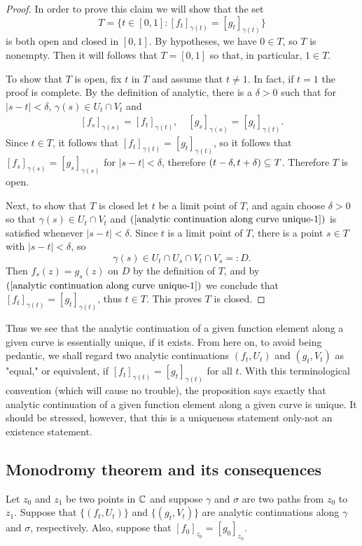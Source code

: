 \begin{proof}
In order to prove this claim we will show that the set
\[T=\{t\in[0,1]:[f_t]_{\gamma(t)}=[g_t]_{\gamma(t)}\}\]
is both open and closed in $[0,1]$. By hypotheses, we have $0\in T$, so $T$ is nonempty. Then it will follows that $T=[0,1]$ so that, in particular, $1\in T$.\par
To show that $T$ is open, fix $t$ in $T$ and assume that $t\neq 1$. In fact, if $t=1$ the proof is complete. By the definition of analytic, there is a $\delta>0$ such that for $|s-t|<\delta$, $\gamma(s)\in U_t\cap V_t$ and
\begin{align}\label{analytic continuation along curve unique-1}
[f_s]_{\gamma(s)}=[f_t]_{\gamma(t)},\quad [g_s]_{\gamma(s)}=[g_t]_{\gamma(t)}.
\end{align}
Since $t\in T$, it follows that $[f_t]_{\gamma(t)}=[g_t]_{\gamma(t)}$, so it follows that $[f_s]_{\gamma(s)}=[g_s]_{\gamma(s)}$ for $|s-t|<\delta$, therefore $(t-\delta,t+\delta)\subseteq T$. Therefore $T$ is open.\par
Next, to show that $T$ is closed let $t$ be a limit point of $T$, and again choose $\delta>0$ so that $\gamma(s)\in U_t\cap V_t$ and $(\ref{analytic continuation along curve unique-1})$ is satisfied whenever $|s-t|<\delta$. Since $t$ is a limit point of $T$, there is a point $s\in T$ with $|s-t|<\delta$, so
\[\gamma(s)\in U_t\cap U_s\cap V_t\cap V_s=:D.\]
Then $f_s(z)=g_s(z)$ on $D$ by the definition of $T$, and by $(\ref{analytic continuation along curve unique-1})$ we conclude that $[f_t]_{\gamma(t)}=[g_{t}]_{\gamma(t)}$, thus $t\in T$. This proves $T$ is closed.
\end{proof}
Thus we see that the analytic continuation of a given function element along a given curve is essentially unique, if it exists. From here on, to avoid being pedantic, we shall regard two analytic continuations $(f_t,U_t)$ and $(g_t,V_t)$ as "equal," or equivalent, if $[f_t]_{\gamma(t)}=[g_t]_{\gamma(t)}$ for all $t$. With this terminological convention (which will cause no trouble), the proposition says exactly that analytic continuation of a given function element along a given curve is unique. It should be stressed, however, that this is a uniqueness statement only-not an existence statement.
\subsection{Monodromy theorem and its consequences}
Let $z_0$ and $z_1$ be two points in $\mathbb{C}$ and suppose $\gamma$ and $\sigma$ are two paths from $z_0$ to $z_1$. Suppose that $\{(f_t,U_t)\}$ and $\{(g_t,V_t)\}$ are analytic continuations along $\gamma$ and $\sigma$, respectively. Also, suppose that $[f_0]_{z_0}=[g_0]_{z_0}$. 

